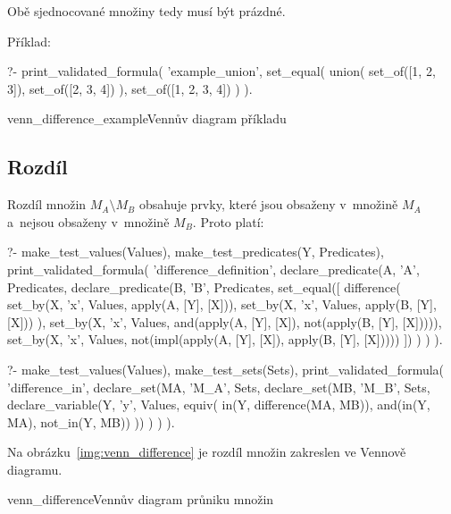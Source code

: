 Obě sjednocované množiny tedy musí být prázdné.

Příklad:

\begin{prolog}
?-	print_validated_formula(
		'example_union',
		set_equal(
			union(
				set_of([1, 2, 3]),
				set_of([2, 3, 4])
			),
			set_of([1, 2, 3, 4])
		)
	).
\end{prolog}

\begin{fig}{venn_difference_example}{Vennův diagram příkladu}
\end{fig}

\subsection{Rozdíl}

Rozdíl množin \(M_A \setminus M_B\) obsahuje prvky, které jsou obsaženy v~množině \(M_A\) a~nejsou obsaženy v~množině \(M_B\). Proto platí:

\begin{prolog}
?- 	make_test_values(Values),
	make_test_predicates(Y, Predicates),
	print_validated_formula(
		'difference_definition',
		declare_predicate(A, 'A', Predicates,
			declare_predicate(B, 'B', Predicates,
				set_equal([
					difference(
						set_by(X, 'x', Values, apply(A, [Y], [X])),
						set_by(X, 'x', Values, apply(B, [Y], [X]))
					),
					set_by(X, 'x', Values, and(apply(A, [Y], [X]), not(apply(B, [Y], [X])))),
					set_by(X, 'x', Values, not(impl(apply(A, [Y], [X]), apply(B, [Y], [X]))))
				])
			)
		)
	).
\end{prolog}

\begin{prolog}
?- 	make_test_values(Values),
	make_test_sets(Sets),
	print_validated_formula(
		'difference_in',
		declare_set(MA, 'M_A', Sets,
			declare_set(MB, 'M_B', Sets,
				declare_variable(Y, 'y', Values, equiv(
					in(Y, difference(MA, MB)),
					and(in(Y, MA), not_in(Y, MB))
				))
			)
		)
	).
\end{prolog}

Na obrázku~\ref{img:venn_difference} je rozdíl množin zakreslen ve Vennově diagramu.

\begin{fig}{venn_difference}{Vennův diagram průniku množin}
\end{fig}

